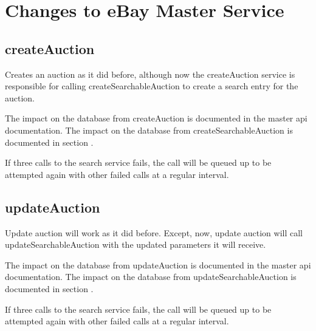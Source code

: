 \documentclass[12pt,a4paper]{article}
\begin{document}
\section{Changes to eBay Master Service}

\subsection{createAuction}

Creates an auction as it did before, although now the createAuction service is
responsible for calling createSearchableAuction to create a search entry for
the auction.

The impact on the database from createAuction is documented in the master api
documentation. The impact on the database from createSearchableAuction is
documented in section .

If three calls to the search service fails, the call will be queued up to be
attempted again with other failed calls at a regular interval.


\subsection{updateAuction}

Update auction will work as it did before. Except, now, update auction will
call updateSearchableAuction with the updated parameters it will receive.

The impact on the database from updateAuction is documented in the master api
documentation. The impact on the database from updateSearchableAuction is
documented in section .

If three calls to the search service fails, the call will be queued up to be
attempted again with other failed calls at a regular interval.
\end{document}
